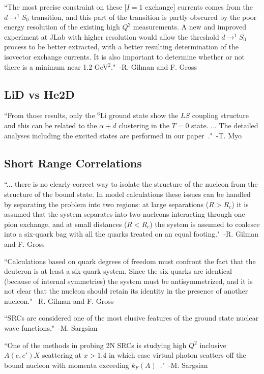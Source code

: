``The most precise constraint on these [$I=1$ exchange] currents comes from the $d\rightarrow ^1S_0$ transition, and this part of the transition is partly obscured by the poor energy resolution of the existing high $Q^2$ measurements. A new and improved experiment at JLab with higher resolution would allow the threshold $d\rightarrow ^1S_0$ process to be better extracted, with a better resulting determination of the isovector exchange currents. It is also important to determine whether or not there is a minimum near 1.2 GeV$^2$."~-R. Gilman and F. Gross~\cite{Gilman:2001yh}


\subsection{LiD vs He2D}

``From those results, only the $^6$Li ground state show the $LS$ coupling structure and this can be related to the $\alpha + d$ clustering in the $T=0$ state. ... The detailed analyses including the excited states are performed in our paper~\cite{Myo:2012pv}."~-T. Myo~\cite{Myo:2013dya}

\subsection{Short Range Correlations}

``... there is no clearly correct way to isolate the structure of the nucleon from the structure of the bound state. In model calculations these issues can be handled by separating the problem into two regions: at large separations ($R>R_c$) it is assumed that the system separates into two nucleons interacting through one pion exchange, and at small distances ($R<R_c$) the system is assumed to coalesce into a six-quark bag with all the quarks treated on an equal footing."~-R. Gilman and F. Gross~\cite{Gilman:2001yh}


``Calculations based on quark degrees of freedom must confront the fact that the deuteron is at least a six-quark system. Since the six quarks are identical (because of internal symmetries) the system must be antisymmetrized, and it is not clear that the nucleon should retain its identity in the presence of another nucleon."~-R. Gilman and F. Gross~\cite{Gilman:2001yh}


``SRCs are considered one of the most elusive features of the ground state nuclear wave functions."~-M. Sargsian~\cite{Sargsian:2012gj}

``One of the methods in probing 2N SRCs is studying high $Q^2$ inclusive $A(e,e')X$ scattering at $x>1.4$ in which case virtual photon scatters off the bound nucleon with momenta exceeding $k_F(A)$~\cite{Sargsian:2001ax, Sargsian:2002wc}."~-M. Sargsian~\cite{Sargsian:2012gj}

